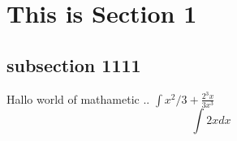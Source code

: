 \documentclass[a4paper,10pt]{article}
\title{}
\author{}
\begin{document}
\maketitle

\begin{abstract}

\end{abstract}

\section{This is Section 1}
\subsection{subsection 1111}
Hallo world of mathametic .. $\int{x^2/3+ \frac{2^3x}{3x^3}}$ \\
$$\int{2x dx}$$
\end{document}
